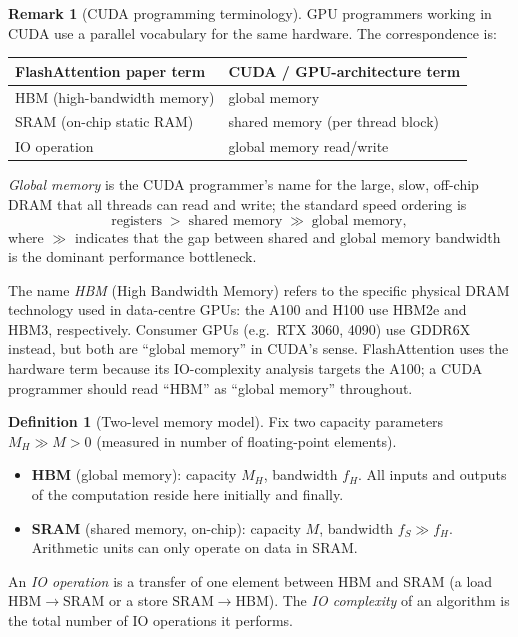 \documentclass[11pt]{amsart}
\theoremstyle{plain}
\theoremstyle{definition}
\newtheorem{definition}[theorem]{Definition}
\newtheorem{remark}[theorem]{Remark}
\begin{document}
\begin{remark}[CUDA programming terminology]
\label{rem:cuda-terms}
GPU programmers working in CUDA use a parallel vocabulary for the same
hardware.  The correspondence is:
\begin{center}
\renewcommand{\arraystretch}{1.2}
\begin{tabular}{ll}
\hline
FlashAttention paper term & CUDA / GPU-architecture term \\
\hline
HBM (high-bandwidth memory) & global memory \\
SRAM (on-chip static RAM) & shared memory (per thread block) \\
IO operation & global memory read/write \\
\hline
\end{tabular}
\end{center}
\emph{Global memory} is the CUDA programmer's name for the large, slow,
off-chip DRAM that all threads can read and write; the standard speed
ordering is
\[
    \text{registers} \;>\; \text{shared memory} \;\gg\; \text{global memory},
\]
where $\gg$ indicates that the gap between shared and global memory
bandwidth is the dominant performance bottleneck.

The name \emph{HBM} (High Bandwidth Memory) refers to the specific
physical DRAM technology used in data-centre GPUs: the A100 and H100
use HBM2e and HBM3, respectively.  Consumer GPUs (e.g.\ RTX 3060, 4090)
use GDDR6X instead, but both are ``global memory'' in CUDA's sense.
FlashAttention uses the hardware term because its IO-complexity analysis
targets the A100; a CUDA programmer should read ``HBM'' as
``global memory'' throughout.
\end{remark}

\begin{definition}[Two-level memory model]
\label{def:memory-model}
Fix two capacity parameters $M_H \gg M > 0$ (measured in number of
floating-point elements).
\begin{itemize}
    \item \textbf{HBM} (global memory): capacity $M_H$, bandwidth $f_H$.
    All inputs and outputs of the computation reside here initially and
    finally.
    \item \textbf{SRAM} (shared memory, on-chip): capacity $M$,
    bandwidth $f_S \gg f_H$.  Arithmetic units can only operate on data
    in SRAM.
\end{itemize}
An \emph{IO operation} is a transfer of one element between HBM and SRAM
(a load $\mathrm{HBM} \to \mathrm{SRAM}$ or a store
$\mathrm{SRAM} \to \mathrm{HBM}$).  The \emph{IO complexity} of an
algorithm is the total number of IO operations it performs.
\end{definition}
\end{document}
